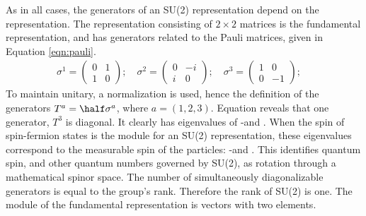As in all cases, the generators of an SU(2) representation depend on the representation.
The representation consisting of $2\times2$ matrices is the fundamental representation, and has generators related to the Pauli matrices, given in Equation \ref{eqn:pauli}.
\begin{equation} \begin{split}\label{eqn:pauli}
    \sigma^1=\begin{pmatrix}0&1\\1&0\end{pmatrix} ;\quad
    \sigma^2=\begin{pmatrix}0&-i\\i&0\end{pmatrix} ;\quad
    \sigma^3=\begin{pmatrix}1&0\\0&-1\end{pmatrix} ;\quad
\end{split} \end{equation}
To maintain unitary, a normalization is used, hence the definition of the generators $T^a=\half\sigma^a$, where $a=(1,2,3)$.
Equation \label{eqn:pauli} reveals that one generator, $T^3$ is diagonal.
It clearly has eigenvalues of -\half and \half.
When the spin of spin-\half fermion states is the module for an SU(2) representation, these eigenvalues correspond to the measurable spin of the particles: -\half and \half.
This identifies quantum spin, and other quantum numbers governed by SU(2), as rotation through a mathematical spinor space.
The number of simultaneously diagonalizable generators is equal to the group's rank. Therefore the rank of SU(2) is one.
The module of the fundamental representation is vectors with two elements.

